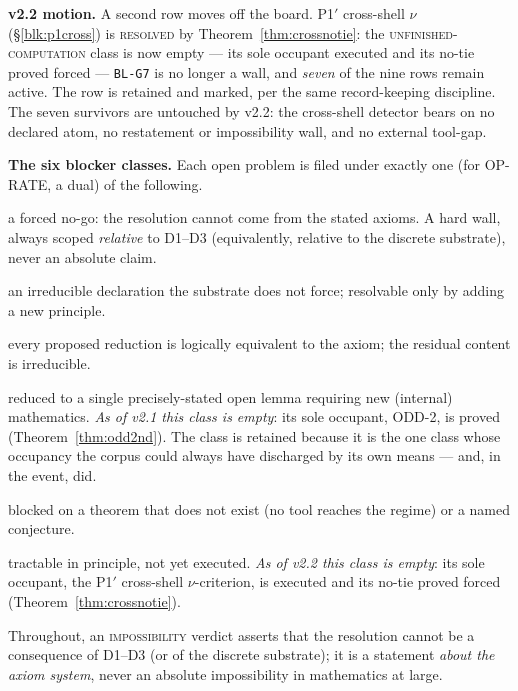 \documentclass[11pt]{article}
\newcommand{\hx}[1]{\textcolor{cC}{\footnotesize\texttt{#1}}}
\theoremstyle{plain}
\theoremstyle{definition}
\theoremstyle{remark}
\begin{document}
\smallskip\noindent
\textbf{v2.2 motion.} A second row moves off the board. P1$'$ cross-shell $\nu$
(\S\ref{blk:p1cross}) is \textsc{resolved} by Theorem~\ref{thm:crossnotie}: the
\textsc{unfinished-computation} class is now empty --- its sole occupant executed
and its no-tie proved forced --- \hx{BL-G7} is no longer a wall, and \emph{seven}
of the nine rows remain active. The row is retained and marked, per the same
record-keeping discipline. The seven survivors are untouched by v2.2: the
cross-shell detector bears on no declared atom, no restatement or impossibility
wall, and no external tool-gap.

\smallskip\noindent
\textbf{The six blocker classes.} Each open problem is filed under exactly one
(for OP-RATE, a dual) of the following.
\begin{description}[font=\normalfont\scshape,leftmargin=2.2em,style=nextline,itemsep=1pt,topsep=3pt]
\item[impossibility] a forced no-go: the resolution cannot come from the stated
axioms. A hard wall, always scoped \emph{relative} to D1--D3 (equivalently,
relative to the discrete substrate), never an absolute claim.
\item[declared-atom] an irreducible declaration the substrate does not force;
resolvable only by adding a new principle.
\item[restatement-wall] every proposed reduction is logically equivalent to the
axiom; the residual content is irreducible.
\item[named-lemma] reduced to a single precisely-stated open lemma requiring new
(internal) mathematics. \emph{As of v2.1 this class is empty}: its sole
occupant, ODD-2, is proved (Theorem~\ref{thm:odd2nd}). The class is retained
because it is the one class whose occupancy the corpus could always have
discharged by its own means --- and, in the event, did.
\item[external-tool-gap] blocked on a theorem that does not exist (no tool
reaches the regime) or a named conjecture.
\item[unfinished-computation] tractable in principle, not yet executed.
\emph{As of v2.2 this class is empty}: its sole occupant, the P1$'$ cross-shell
$\nu$-criterion, is executed and its no-tie proved forced
(Theorem~\ref{thm:crossnotie}).
\end{description}
Throughout, an \textsc{impossibility} verdict asserts that the resolution cannot
be a consequence of D1--D3 (or of the discrete substrate); it is a statement
\emph{about the axiom system}, never an absolute impossibility in mathematics at
large.
\end{document}
